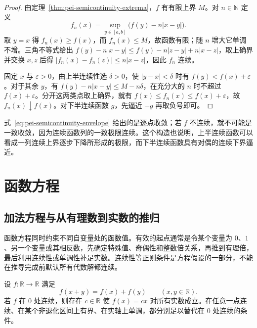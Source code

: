 \begin{proof}
由定理~\ref{thm:pei-semicontinuity-extrema}，$f$ 有有限上界 $M$。对 $n\in\mathbb N$ 定义
\begin{equation}
\label{eq:pei-semicontinuity-envelope}
f_n(x)=\sup_{y\in[a,b]}\bigl(f(y)-n|x-y|\bigr).
\end{equation}
取 $y=x$ 得 $f_n(x)\ge f(x)$，而 $f_n(x)\le M$，故函数有限；随 $n$ 增大它单调不增。三角不等式给出 $f(y)-n|x-y|\le f(y)-n|z-y|+n|x-z|$，取上确界并交换 $x,z$ 后得 $|f_n(x)-f_n(z)|\le n|x-z|$，因此 $f_n$ 连续。

固定 $x$ 与 $\varepsilon>0$，由上半连续性选 $\delta>0$，使 $|y-x|<\delta$ 时有 $f(y)<f(x)+\varepsilon$。对于其余 $y$，有 $f(y)-n|x-y|\le M-n\delta$，在充分大的 $n$ 时不超过 $f(x)+\varepsilon$。分开这两类点取上确界，就有 $f(x)\le f_n(x)\le f(x)+\varepsilon$，故 $f_n(x)\downarrow f(x)$。对下半连续函数 $g$，先逼近 $-g$ 再取负号即可。
\end{proof}

式~\eqref{eq:pei-semicontinuity-envelope} 给出的是逐点收敛；若 $f$ 不连续，就不可能是一致收敛，因为连续函数列的一致极限连续。这个构造也说明，上半连续函数可以看成一列连续上界逐步下降所形成的极限，而下半连续函数具有对偶的连续下界逼近。

\section{函数方程}
\label{sec:pei-functional-equations}

\subsection{加法方程与从有理数到实数的推归}

函数方程同时约束不同自变量处的函数值。有效的起点通常是令某个变量为 $0$、$1$、另一个变量或其相反数，先确定特殊值、奇偶性和整数倍关系，再推到有理倍，最后利用连续性或单调性补足实数。连续性等正则条件是方程假设的一部分，不能在推导完成前默认所有代数解都连续。

\begin{theorem}
\label{thm:pei-cauchy-additive}
设 $f:\mathbb R\to\mathbb R$ 满足
\begin{equation}
\label{eq:pei-cauchy-additive}
f(x+y)=f(x)+f(y)\qquad(x,y\in\mathbb R).
\end{equation}
若 $f$ 在 $0$ 处连续，则存在 $c\in\mathbb R$ 使 $f(x)=cx$ 对所有实数成立。在任意一点连续、在某个非退化区间上有界、在实轴上单调，都分别足以替代在 $0$ 处连续的条件。
\end{theorem}

